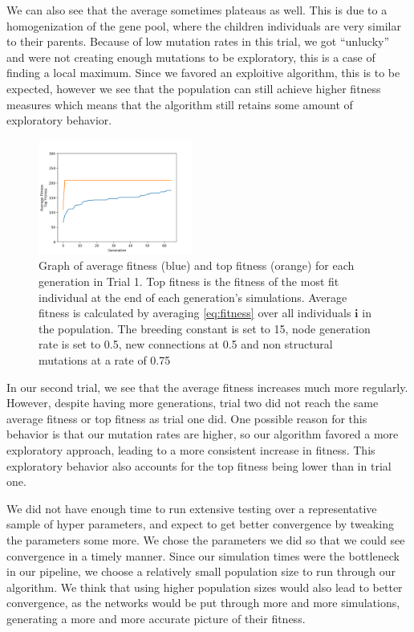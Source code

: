 \documentclass{article}
\begin{document}
\begin{multicols}{2}
We can also see that the average sometimes plateaus as well. This is due to a
homogenization of the gene pool, where the children individuals are very
similar to their parents. Because of low mutation rates in this trial, we got
``unlucky'' and were not creating enough mutations to be exploratory, this is a
case of finding a local maximum. Since we favored an exploitive algorithm, this
is to be expected, however we see that the population can still achieve higher
fitness measures which means that the algorithm still retains some amount of
exploratory behavior.

\begin{figure}[H]\label{fig:fitness graph}
\centering
\includegraphics[width=0.45\textwidth]{fig_2}
\begin{changemargin}{0.15in}{0.15in}
  \caption{Graph of average fitness (blue) and top fitness (orange) for each
    generation in Trial 1. Top fitness is the fitness of the most fit individual
    at the end of each generation's simulations. Average fitness is calculated
    by averaging \eqref{eq:fitness} over all individuals $\bm{i}$ in the
    population. The breeding constant is set to 15, node generation rate is set
    to 0.5, new connections at 0.5 and non structural mutations at a rate of
    0.75}
\end{changemargin}
\end{figure}

In our second trial, we see that the average fitness increases much more
regularly. However, despite having more generations, trial two did not reach the
same average fitness or top fitness as trial one did. One possible reason for
this behavior is that our mutation rates are higher, so our algorithm favored a
more exploratory approach, leading to a more consistent increase in
fitness. This exploratory behavior also accounts for the top fitness being lower
than in trial one.

We did not have enough time to run extensive testing over a representative
sample of hyper parameters, and expect to get better convergence by tweaking the
parameters some more. We chose the parameters we did so that we could see
convergence in a timely manner. Since our simulation times were the bottleneck
in our pipeline, we choose a relatively small population size to run through our
algorithm. We think that using higher population sizes would also lead to better
convergence, as the networks would be put through more and more simulations,
generating a more and more accurate picture of their fitness.


\end{multicols}
\end{document}
